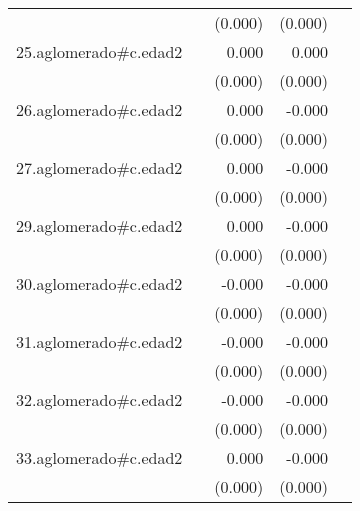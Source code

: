 {\begin{longtable}{l*{4}{D{.}{.}{-1}}}
            &                     &     (0.000)         &     (0.000)         &                     \\
\addlinespace
25.aglomerado#c.edad2&                     &       0.000         &       0.000         &                     \\
            &                     &     (0.000)         &     (0.000)         &                     \\
\addlinespace
26.aglomerado#c.edad2&                     &       0.000         &      -0.000         &                     \\
            &                     &     (0.000)         &     (0.000)         &                     \\
\addlinespace
27.aglomerado#c.edad2&                     &       0.000         &      -0.000         &                     \\
            &                     &     (0.000)         &     (0.000)         &                     \\
\addlinespace
29.aglomerado#c.edad2&                     &       0.000         &      -0.000         &                     \\
            &                     &     (0.000)         &     (0.000)         &                     \\
\addlinespace
30.aglomerado#c.edad2&                     &      -0.000         &      -0.000\sym{**} &                     \\
            &                     &     (0.000)         &     (0.000)         &                     \\
\addlinespace
31.aglomerado#c.edad2&                     &      -0.000         &      -0.000\sym{***}&                     \\
            &                     &     (0.000)         &     (0.000)         &                     \\
\addlinespace
32.aglomerado#c.edad2&                     &      -0.000         &      -0.000\sym{***}&                     \\
            &                     &     (0.000)         &     (0.000)         &                     \\
\addlinespace
33.aglomerado#c.edad2&                     &       0.000         &      -0.000\sym{***}&                     \\
            &                     &     (0.000)         &     (0.000)         &                     \\

\end{longtable}}
